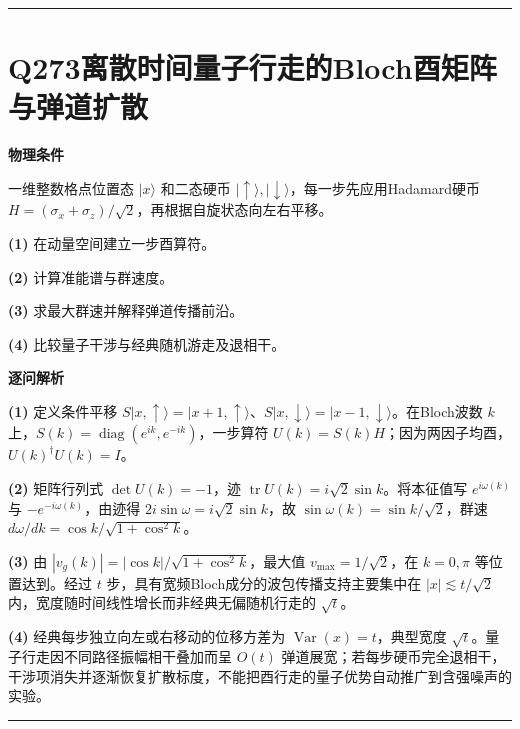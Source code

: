 \documentclass[UTF8,a4paper,11pt,oneside,openany]{ctexbook}
\begin{document}
\par\bigskip\hrule\bigskip
\section*{Q273\quad 离散时间量子行走的Bloch酉矩阵与弹道扩散}
\textbf{物理条件}\par 一维整数格点位置态 \(|x\rangle\) 和二态硬币 \(|\uparrow\rangle,|\downarrow\rangle\)，每一步先应用Hadamard硬币 \(H=(\sigma_x+\sigma_z)/\sqrt2\)，再根据自旋状态向左右平移。
\par\noindent\textbf{(1)} 在动量空间建立一步酉算符。
\par\noindent\textbf{(2)} 计算准能谱与群速度。
\par\noindent\textbf{(3)} 求最大群速并解释弹道传播前沿。
\par\noindent\textbf{(4)} 比较量子干涉与经典随机游走及退相干。

\par\medskip\noindent\textbf{逐问解析}
\par\noindent\textbf{(1)} 定义条件平移 \(S|x,\uparrow\rangle=|x+1,\uparrow\rangle\)、\(S|x,\downarrow\rangle=|x-1,\downarrow\rangle\)。在Bloch波数 \(k\) 上，\(S(k)=\operatorname{diag}(e^{ik},e^{-ik})\)，一步算符 \(U(k)=S(k)H\)；因为两因子均酉，\(U(k)^\dagger U(k)=I\)。
\par\noindent\textbf{(2)} 矩阵行列式 \(\det U(k)=-1\)，迹 \(\operatorname{tr}U(k)=i\sqrt2\sin k\)。将本征值写 \(e^{i\omega(k)}\) 与 \(-e^{-i\omega(k)}\)，由迹得 \(2i\sin\omega=i\sqrt2\sin k\)，故 \(\sin\omega(k)=\sin k/\sqrt2\)，群速 \(d\omega/dk=\cos k/\sqrt{1+\cos^2 k}\)。
\par\noindent\textbf{(3)} 由 \(|v_g(k)|=|\cos k|/\sqrt{1+\cos^2k}\)，最大值 \(v_{\max}=1/\sqrt2\)，在 \(k=0,\pi\) 等位置达到。经过 \(t\) 步，具有宽频Bloch成分的波包传播支持主要集中在 \(|x|\lesssim t/\sqrt2\) 内，宽度随时间线性增长而非经典无偏随机行走的 \(\sqrt t\)。
\par\noindent\textbf{(4)} 经典每步独立向左或右移动的位移方差为 \(\operatorname{Var}(x)=t\)，典型宽度 \(\sqrt t\)。量子行走因不同路径振幅相干叠加而呈 \(O(t)\) 弹道展宽；若每步硬币完全退相干，干涉项消失并逐渐恢复扩散标度，不能把酉行走的量子优势自动推广到含强噪声的实验。

\par\bigskip\hrule\bigskip
\end{document}
